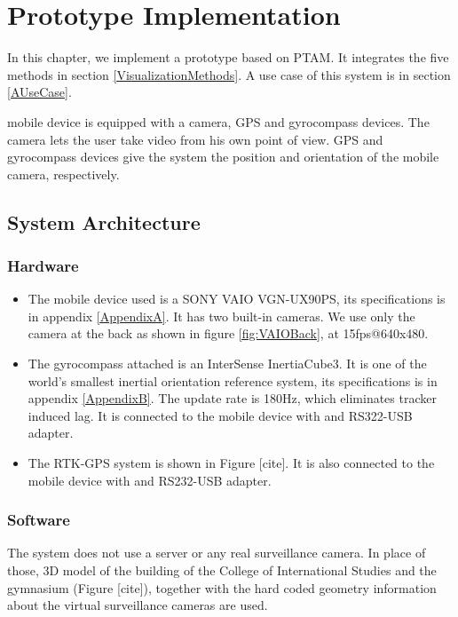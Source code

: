 \chapter{Prototype Implementation}
\label{Chapter4}

In this chapter, we implement a prototype based on PTAM. It integrates the five methods in section \ref{VisualizationMethods}. A use case of this system is in section \ref{AUseCase}.

mobile device is equipped with a camera, GPS and gyrocompass devices. The camera lets the user take video from his own point of view. GPS and gyrocompass devices give the system the position and orientation of the mobile camera, respectively.


\section{System Architecture}

\subsection{Hardware}

\begin{itemize}
	\item The mobile device used is a SONY VAIO VGN-UX90PS, its specifications is in appendix \ref{AppendixA}. It has two built-in cameras. We use only the camera at the back as shown in figure \ref{fig:VAIOBack}, at 15fps@640x480.
	\item The gyrocompass attached is an InterSense InertiaCube3. It is one of the world's smallest inertial orientation reference system, its specifications is in appendix \ref{AppendixB}. The update rate is 180Hz, which eliminates tracker induced lag. It is connected to the mobile device with and RS322-USB adapter.
	\item The RTK-GPS system is shown in Figure [cite]. It is also connected to the mobile device with and RS232-USB adapter.
\end{itemize}

\subsection{Software}

The system does not use a server or any real surveillance camera. In place of those, 3D model of the building of the College of International Studies and the gymnasium (Figure [cite]), together with the hard coded geometry information about the virtual surveillance cameras are used.

